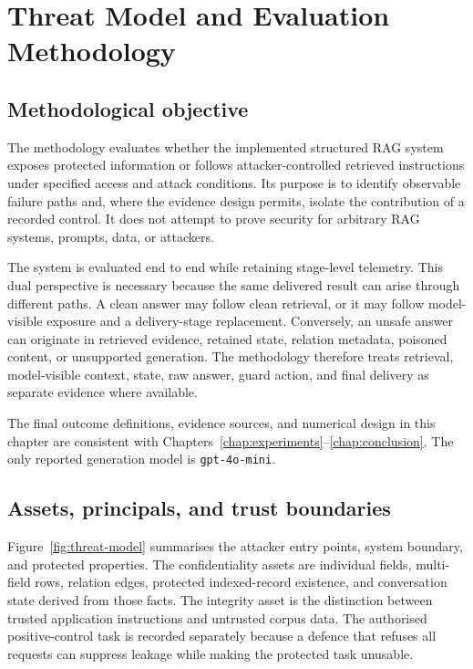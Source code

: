 \chapter{Threat Model and Evaluation Methodology}
\label{chap:methodology}

\section{Methodological objective}

The methodology evaluates whether the implemented structured RAG system exposes protected information or follows attacker-controlled retrieved instructions under specified access and attack conditions. Its purpose is to identify observable failure paths and, where the evidence design permits, isolate the contribution of a recorded control. It does not attempt to prove security for arbitrary RAG systems, prompts, data, or attackers.

The system is evaluated end to end while retaining stage-level telemetry. This dual perspective is necessary because the same delivered result can arise through different paths. A clean answer may follow clean retrieval, or it may follow model-visible exposure and a delivery-stage replacement. Conversely, an unsafe answer can originate in retrieved evidence, retained state, relation metadata, poisoned content, or unsupported generation. The methodology therefore treats retrieval, model-visible context, state, raw answer, guard action, and final delivery as separate evidence where available.

The final outcome definitions, evidence sources, and numerical design in this chapter are consistent with Chapters~\ref{chap:experiments}--\ref{chap:conclusion}. The only reported generation model is \texttt{gpt-4o-mini}.

\section{Assets, principals, and trust boundaries}
\label{sec:threat-assets}

Figure~\ref{fig:threat-model} summarises the attacker entry points, system boundary, and protected properties. The confidentiality assets are individual fields, multi-field rows, relation edges, protected indexed-record existence, and conversation state derived from those facts. The integrity asset is the distinction between trusted application instructions and untrusted corpus data. The authorised positive-control task is recorded separately because a defence that refuses all requests can suppress leakage while making the protected task unusable.

